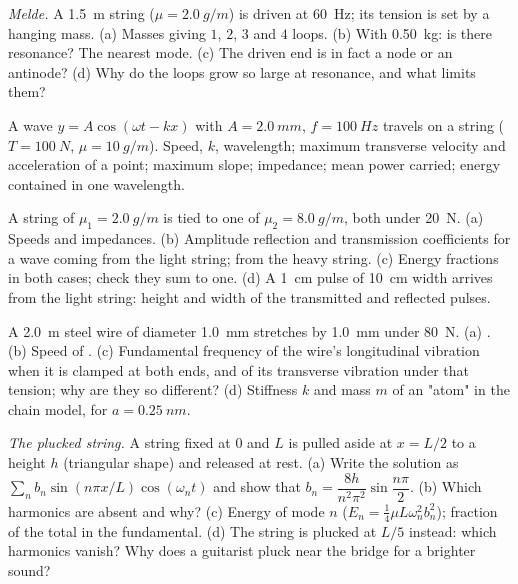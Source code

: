 \begin{exercise}[$\star\star$]\label{exo:b2:waves-on-strings:6}
\emph{Melde.} A \qty{1.5}{m} string ($\mu = \qty{2.0}{g/m}$) is driven at
\qty{60}{Hz}; its tension is set by a hanging mass. (a) Masses giving
$1$, $2$, $3$ and $4$ loops. (b) With \qty{0.50}{kg}: is there resonance?
The nearest mode. (c) The driven end is in fact a node or an antinode?
(d) Why do the loops grow so large at resonance, and what limits them?
\end{exercise}

\begin{exercise}[$\star\star$]\label{exo:b2:waves-on-strings:7}
A wave $y = A\cos(\omega t - kx)$ with $A = \qty{2.0}{mm}$, $f = \qty{100}{Hz}$
travels on a string ($T = \qty{100}{N}$, $\mu = \qty{10}{g/m}$). Speed, $k$,
wavelength; maximum transverse velocity and acceleration of a point;
maximum slope; impedance; mean power carried; energy contained in one
wavelength.
\end{exercise}

\begin{exercise}[$\star\star$]\label{exo:b2:waves-on-strings:8}
A string of $\mu_1 = \qty{2.0}{g/m}$ is tied to one of $\mu_2 = \qty{8.0}{g/m}$,
both under \qty{20}{N}. (a) Speeds and impedances. (b) Amplitude
reflection and transmission coefficients for a wave coming from the
light string; from the heavy string. (c) Energy fractions in both
cases; check they sum to one. (d) A \qty{1}{cm} pulse of \qty{10}{cm} width
arrives from the light string: height and width of the transmitted and
reflected pulses.
\end{exercise}

\begin{exercise}[$\star\star$]\label{exo:b2:waves-on-strings:9}
A \qty{2.0}{m} steel wire of diameter \qty{1.0}{mm} stretches by \qty{1.0}{mm}
under \qty{80}{N}. (a) . (b) Speed of .
(c) Fundamental frequency of the wire's longitudinal vibration when it
is clamped at both ends, and of its transverse vibration under that
tension; why are they so different? (d) Stiffness $k$ and mass $m$ of an
"atom" in the chain model, for $a = \qty{0.25}{nm}$.
\end{exercise}

\begin{exercise}[$\star\star\star$]\label{exo:b2:waves-on-strings:10}
\emph{The plucked string.} A string fixed at $0$ and $L$ is pulled aside
at $x = L/2$ to a height $h$ (triangular shape) and released at rest.
(a) Write the solution as $\sum_nb_n\sin(n\pi x/L)\cos(\omega_nt)$ and show
that $b_n = \dfrac{8h}{n^2\pi^2}\sin\dfrac{n\pi}2$. (b) Which harmonics are
absent and why? (c) Energy of mode $n$ ($E_n = \tfrac14\mu L\omega_n^2b_n^2$);
fraction of the total in the fundamental. (d) The string is plucked at
$L/5$ instead: which harmonics vanish? Why does a guitarist pluck near
the bridge for a brighter sound?
\end{exercise}


